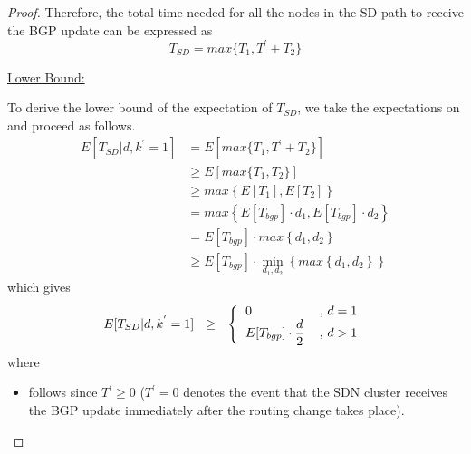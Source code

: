 \begin{proof}
Therefore, the total time needed for all the nodes in the SD-path to receive the BGP update can be expressed as
\begin{equation}\label{eq:Tsd-definition}
T_{SD} = max\{T_{1} , T^{'}+T_{2}\}
\end{equation}

\vspace{\baselineskip}
\noindent\underline{Lower Bound:}

To derive the lower bound of the expectation of $T_{SD}$, we take the expectations on  and proceed as follows.
\begin{align}
E[T_{SD}|d,k^{'}=1] 
&= E\left[max\{T_{1} , T^{'}+T_{2}\}\right] \\
&\geq E\left[max\{T_{1} , T_{2}\}\right] \label{eq:Tprime-0}\\
&\geq max\left\{E[T_{1}] , E[T_{2}]\right\} \label{eq:Expectation-vs-Max}\\
&= max\left\{E[T_{bgp}]\cdot d_{1} , E[T_{bgp}]\cdot d_{2}\right\} \label{eq:Expectations-times-ETbgp}\\
&= E[T_{bgp}]\cdot max\left\{ d_{1} ,  d_{2}\right\} \\
&\geq E[T_{bgp}]\cdot \displaystyle\min_{d_{1},d_{2}}\left\{max\left\{ d_{1} ,  d_{2}\right\}\right\} \label{eq:min-d1-d2}
\end{align}
which gives
\begin{equation}\label{eq:d1-d2-dover2}
E[T_{SD}|d,k^{'}=1] ~~\geq~~ \left\{
\begin{tabular}{lc}
$\displaystyle 0$				&, $d=1$\\
$\displaystyle E[T_{bgp}]\cdot \frac{d}{2}$	&, $d>1$
\end{tabular}
\right.
\end{equation}
where 
\begin{itemize}
\item {} follows since $T^{'}\geq 0$ ($T^{'}=0$ denotes the event that the SDN cluster receives the BGP update immediately after the routing change takes place).


\end{itemize}
\end{proof}
